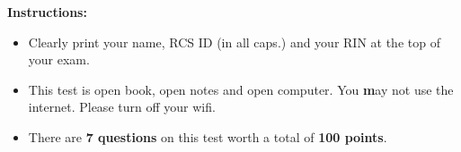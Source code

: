 \documentclass[10pt]{article}
\begin{document}
\vspace*{.45in} 

{\large\bf Instructions:}
\begin{itemize}
\item Clearly print your name, RCS ID (in all caps.) and your RIN at the top of your exam.
\item This test is open book, open notes and open computer. You {\textbf may not} use the internet. Please turn off your wifi.
\item There are \textbf{7 questions} on this test worth a total of
  \textbf{100 points}.
\end{itemize}


\newpage

\fi
\end{document}
